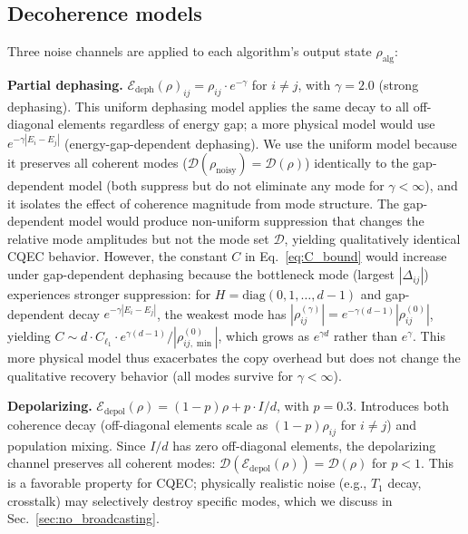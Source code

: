 \documentclass[prx,twocolumn,superscriptaddress,longbibliography,floatfix]{revtex4-2}
\begin{document}
\subsection{Decoherence models}
\label{sec:noise}

Three noise channels are applied to each algorithm's output state $\rho_\mathrm{alg}$:

\textbf{Partial dephasing.}
$\mathcal{E}_\mathrm{deph}(\rho)_{ij} = \rho_{ij} \cdot e^{-\gamma}$ for $i \neq j$, with $\gamma = 2.0$ (strong dephasing).
This uniform dephasing model applies the same decay to all off-diagonal elements regardless of energy gap; a more physical model would use $e^{-\gamma|E_i - E_j|}$ (energy-gap-dependent dephasing).
We use the uniform model because it preserves all coherent modes ($\mathcal{D}(\rho_\mathrm{noisy}) = \mathcal{D}(\rho)$) identically to the gap-dependent model (both suppress but do not eliminate any mode for $\gamma < \infty$), and it isolates the effect of coherence magnitude from mode structure.
The gap-dependent model would produce non-uniform suppression that changes the relative mode amplitudes but not the mode set $\mathcal{D}$, yielding qualitatively identical CQEC behavior.
However, the constant $C$ in Eq.~\eqref{eq:C_bound} would increase under gap-dependent dephasing because the bottleneck mode (largest $|\Delta_{ij}|$) experiences stronger suppression: for $H = \mathrm{diag}(0,1,\ldots,d-1)$ and gap-dependent decay $e^{-\gamma|E_i-E_j|}$, the weakest mode has $|\rho_{ij}^{(\gamma)}| = e^{-\gamma(d-1)}|\rho_{ij}^{(0)}|$, yielding $C \sim d \cdot C_{\ell_1} \cdot e^{\gamma(d-1)} / |\rho_{ij,\min}^{(0)}|$, which grows as $e^{\gamma d}$ rather than $e^{\gamma}$.
This more physical model thus exacerbates the copy overhead but does not change the qualitative recovery behavior (all modes survive for $\gamma < \infty$).

\textbf{Depolarizing.}
$\mathcal{E}_\mathrm{depol}(\rho) = (1-p)\rho + p \cdot I/d$, with $p = 0.3$.
Introduces both coherence decay (off-diagonal elements scale as $(1-p)\rho_{ij}$ for $i \neq j$) and population mixing.
Since $I/d$ has zero off-diagonal elements, the depolarizing channel preserves all coherent modes: $\mathcal{D}(\mathcal{E}_\mathrm{depol}(\rho)) = \mathcal{D}(\rho)$ for $p < 1$.
This is a favorable property for CQEC; physically realistic noise (e.g., $T_1$ decay, crosstalk) may selectively destroy specific modes, which we discuss in Sec.~\ref{sec:no_broadcasting}.
\end{document}
